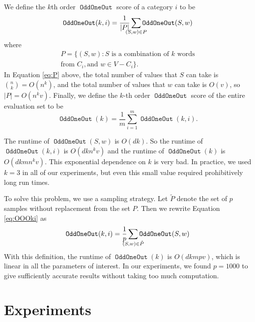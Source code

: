 \documentclass[11pt,a4paper]{article}
\DeclareMathOperator{\OddOneOut}{\texttt{OddOneOut}}
\DeclareMathOperator{\topk}{\texttt{Topk}}
\begin{document}
We define the $k$th order $\OddOneOut$ score of a category $i$ to be
\begin{equation}
    \OddOneOut(k,i) = \frac 1 {|P|} \sum_{\mathclap{(S,w) \in P}} \OddOneOut(S,w)
    \label{eq:OOOki}
\end{equation}
where
\begin{multline}
    P = \{ (S, w) : S \text{~is a combination of $k$ words}\\\text{from $C_i$}, \text{and~} w \in V-C_i \}
    .
    \label{eq:P}
\end{multline}
In Equation \eqref{eq:P} above,
the total number of values that $S$ can take is ${n \choose k} = O(n^k)$,
and the total number of values that $w$ can take is $O(v)$,
so $|P| = O(n^kv)$.
Finally, we define the $k$-th order $\OddOneOut$ score of the entire evaluation set to be
\begin{equation}
    \OddOneOut(k) = \frac 1 m \sum_{i=1}^m \OddOneOut(k,i)
    .
\end{equation}

The runtime of $\OddOneOut(S,w)$ is $O(dk)$.
So the runtime of $\OddOneOut(k,i)$ is $O(dkn^kv)$ and the runtime of $\OddOneOut(k)$ is $O(dkmn^kv)$.
This exponential dependence on $k$ is very bad.
In practice, we used $k=3$ in all of our experiments,
but even this small value required prohibitively long run times.


To solve this problem, we use a sampling strategy.
Let $\tilde P$ denote the set of $p$ samples without replacement from the set $P$.
Then we rewrite Equation \ref{eq:OOOki} as
\begin{equation}
    \OddOneOut(k,i) = \frac 1 p \sum_{\mathclap{(S,w) \in \tilde P}} \OddOneOut(S,w)
\end{equation}
With this definition, the runtime of $\OddOneOut(k)$ is $O(dkmpv)$,
which is linear in all the parameters of interest.
In our experiments, we found $p=1000$ to give sufficiently accurate results without taking too much computation.

\section{Experiments}
\label{sec:experiments}
\end{document}
